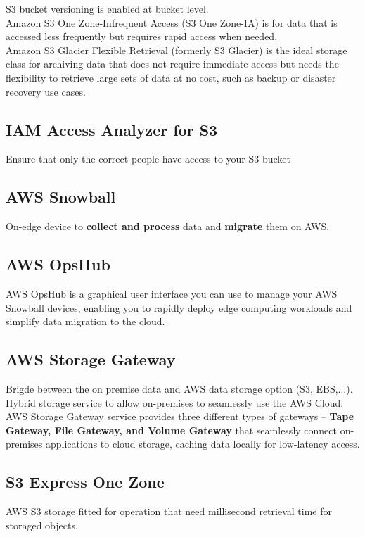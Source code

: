 \documentclass[12pt, letterpaper, twoside]{article}
\begin{document}
S3 bucket versioning is enabled at bucket level.\\
Amazon S3 One Zone-Infrequent Access (S3 One Zone-IA) is for data that is accessed less frequently but 
requires rapid access when needed.\\
Amazon S3 Glacier Flexible Retrieval (formerly S3 Glacier) is the ideal storage class for archiving data 
that does not require immediate access but needs the flexibility to retrieve large sets of data at no cost, 
such as backup or disaster recovery use cases.\\ 

\subsection{IAM Access Analyzer for S3}
Ensure that only the correct people have access to your S3 bucket

\subsection{AWS Snowball}
On-edge device to \textbf{collect and process} data and \textbf{migrate} them on AWS.\\

\subsection{AWS OpsHub}
AWS OpsHub is a graphical user interface you can use to manage your AWS Snowball devices, enabling you to 
rapidly deploy edge computing workloads and simplify data migration to the cloud.\\

\subsection{AWS Storage Gateway}
Brigde between the on premise data and AWS data storage option (S3, EBS,...).\\
Hybrid storage service to allow on-premises to seamlessly use the AWS Cloud.\\
AWS Storage Gateway service provides three different types of gateways – \textbf{Tape Gateway, File Gateway, and Volume Gateway}
that seamlessly connect on-premises applications to cloud storage, caching data locally for low-latency access.

\subsection{S3 Express One Zone}
AWS S3 storage fitted for operation that need millisecond retrieval time for storaged objects.\\
\end{document}
